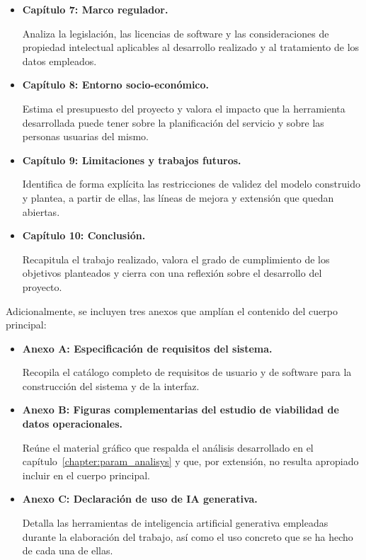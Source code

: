 \begin{itemize}
    \item \textbf{Capítulo 7: Marco regulador.}
    
    Analiza la legislación, las licencias de software y las consideraciones de propiedad intelectual aplicables al desarrollo
    realizado y al tratamiento de los datos empleados.

    \item \textbf{Capítulo 8: Entorno socio-económico.}
    
    Estima el presupuesto del
    proyecto y valora el impacto que la herramienta desarrollada puede tener sobre la
    planificación del servicio y sobre las personas usuarias del mismo.

    \item \textbf{Capítulo 9: Limitaciones y trabajos futuros.}
    
    Identifica de forma
    explícita las restricciones de validez del modelo construido y plantea, a partir de
    ellas, las líneas de mejora y extensión que quedan abiertas.

    \item \textbf{Capítulo 10: Conclusión.}
    
    Recapitula el trabajo realizado, valora el
    grado de cumplimiento de los objetivos planteados y cierra con una reflexión sobre
    el desarrollo del proyecto.

\end{itemize}

Adicionalmente, se incluyen tres anexos que amplían el contenido del cuerpo principal:

\begin{itemize}
    \item \textbf{Anexo A: Especificación de requisitos del sistema.}
    
    Recopila el
    catálogo completo de requisitos de usuario y de software para la construcción del sistema
    y de la interfaz.

    \item \textbf{Anexo B: Figuras complementarias del estudio de viabilidad de datos
    operacionales.}
    
    Reúne el material gráfico que respalda el análisis desarrollado en
    el capítulo~\ref{chapter:param_analisys} y que, por extensión, no resulta apropiado incluir en el cuerpo
    principal.

    \item \textbf{Anexo C: Declaración de uso de IA generativa.}
    
    Detalla las herramientas
    de inteligencia artificial generativa empleadas durante la elaboración del trabajo,
    así como el uso concreto que se ha hecho de cada una de ellas.
\end{itemize}